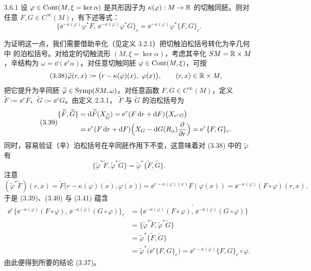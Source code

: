 \begin{wprop}{3.6.1}
设 $\varphi\in\operatorname{Cont}(M,\xi=\ker\alpha)$ 是共形因子为
$\kappa(\varphi):M\to\mathbb{R}$ 的切触同胚。则对任意
$F,G\in C^\infty(M)$，有下述等式：
\begin{equation}\tag{3.37}
  \bigl\{\ee^{-\kappa(\varphi)}\varphi^*F,\,
  \ee^{-\kappa(\varphi)}\varphi^*G\bigr\}_{c}
  =\ee^{-\kappa(\varphi)}\varphi^*\{F,G\}_{c}.
\end{equation}
\end{wprop}

\begin{wproof}
为证明这一点，我们需要借助辛化（见定义 3.2.1）把切触泊松括号转化为辛几何中
的泊松括号。对给定的切触流形 $(M,\xi=\ker\alpha)$，考虑其辛化
$SM=\mathbb{R}\times M$，辛结构为 $\omega=\dd(\ee^r\alpha)$。对任意切触同胚
$\varphi\in\operatorname{Cont}(M,\xi)$，可按
\begin{equation}\tag{3.38}
  \widetilde{\varphi}(r,x):=\bigl(r-\kappa(\varphi)(x),\ \varphi(x)\bigr),
  \qquad (r,x)\in\R\times M,
\end{equation}
把它提升为辛同胚 $\widetilde{\varphi}\in\operatorname{Symp}(SM,\omega)$。对任意函数
$F,G\in C^\infty(M)$，定义
$\widetilde{F}:=\ee^rF$、$\widetilde{G}:=\ee^rG$。由定义 2.3.1，
$\widetilde{F}$ 与 $\widetilde{G}$ 的泊松括号为
\begin{equation}\tag{3.39}
\begin{aligned}
  \{\widetilde{F},\widetilde{G}\}
  &=\mathrm{d}\widetilde{F}(X_{\widetilde{G}})
   =\mathrm{e}^r(F\,\mathrm{d} r+\mathrm{d} F)\bigl(X_{\mathrm{e}^rG}\bigr)\\
  &=\mathrm{e}^r(F\,\mathrm{d} r+\mathrm{d} F)\Bigl(X_G-\mathrm{d} G(R_\alpha)
   \frac{\partial}{\partial r}\Bigr)
   =\mathrm{e}^r\{F,G\}_{c}.
\end{aligned}
\end{equation}
同时，容易验证（辛）泊松括号在辛同胚作用下不变，这意味着对 (3.38) 中的
$\widetilde{\varphi}$ 有
\begin{equation}\tag{3.40}
  \{\widetilde{\varphi}^*\widetilde{F},
  \widetilde{\varphi}^*\widetilde{G}\}
  =\widetilde{\varphi}^*\{\widetilde{F},\widetilde{G}\}.
\end{equation}
注意
\begin{equation}\tag{3.41}
  (\widetilde{\varphi}^*\widetilde{F})(r,x)
  =\widetilde{F}\bigl(r-\kappa(\varphi)(x),\varphi(x)\bigr)
  =\ee^{r-\kappa(\varphi)(x)}F(\varphi(x))
  =\ee^{-\kappa(\varphi)}(F\circ\varphi)(r,x).
\end{equation}
于是 (3.39)、(3.40) 与 (3.41) 蕴含
\begin{align*}
  \ee^r\bigl\{\ee^{-\kappa(\varphi)}(F\circ\varphi),\,
  \ee^{-\kappa(\varphi)}(G\circ\varphi)\bigr\}_{c}
  &=\widetilde{\bigl\{\ee^{-\kappa(\varphi)}(F\circ\varphi),\,
   \ee^{-\kappa(\varphi)}(G\circ\varphi)\bigr\}}\\
  &=\{\widetilde{\varphi}^*\widetilde{F},
   \widetilde{\varphi}^*\widetilde{G}\}\\
  &=\widetilde{\varphi}^*\{\widetilde{F},\widetilde{G}\}\\
  &=\widetilde{\varphi}^*\bigl(\ee^r\{F,G\}_{c}\bigr)
   =\ee^{r-\kappa(\varphi)}\{F,G\}_{c}\circ\varphi .
\end{align*}
由此便得到所要的结论 (3.37)。
\end{wproof}

